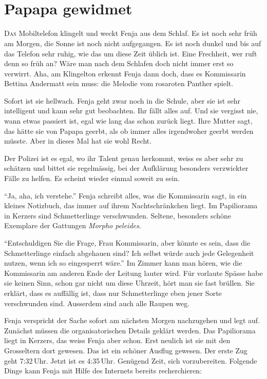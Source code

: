 \chapter*{{}\\\small \color{red} Papapa gewidmet}
\lettrine[lines=3]{\color{red}D}{as} Mobiltelefon klingelt und weckt Fenja aus dem Schlaf. Es ist noch sehr früh am Morgen, die Sonne ist noch nicht aufgegangen. Es ist noch dunkel und bis auf das Telefon sehr ruhig, wie das um diese Zeit üblich ist. Eine Frechheit, wer ruft denn so früh an? Wäre man nach dem Schlafen doch nicht immer erst so verwirrt. Aha, am Klingelton erkennt Fenja dann doch, dass es Kommissarin Bettina Andermatt sein muss: die Melodie vom rosaroten Panther spielt.

Sofort ist sie hellwach. Fenja geht zwar noch in die Schule, aber sie ist sehr intelligent und kann sehr gut beobachten. Ihr fällt alles auf. Und sie vergisst nie, wann etwas passiert ist, egal wie lang das schon zurück liegt. Ihre Mutter sagt, das hätte sie von Papapa geerbt, als ob immer alles irgendwoher geerbt werden müsste. Aber in dieses Mal hat sie wohl Recht. 

Der Polizei ist es egal, wo ihr Talent genau herkommt, weiss es aber sehr zu schätzen und bittet sie regelmässig, bei der Aufklärung besonders verzwickter Fälle zu helfen. Es scheint wieder einmal soweit zu sein.

\enquote{Ja, aha, ich verstehe.} Fenja schreibt alles, was die Kommissarin sagt, in ein kleines Notizbuch, das immer auf ihrem Nachtschränkchen liegt. Im Papiliorama in Kerzers sind Schmetterlinge verschwunden. Seltene, besonders schöne Exemplare der Gattungen \emph{Morpho peleides}.

\enquote{Entschuldigen Sie die Frage, Frau Kommissarin, aber könnte es sein, dass die Schmetterlinge einfach abgehauen sind? Ich selbst würde auch jede Gelegenheit nutzen, wenn ich so eingesperrt wäre.} Im Zimmer kann man hören, wie die Kommissarin am anderen Ende der Leitung lauter wird. Für vorlaute Spässe habe sie keinen Sinn, schon gar nicht um diese Uhrzeit, hört man sie fast brüllen. Sie erklärt, dass es auffällig ist, dass nur Schmetterlinge eben jener Sorte verschwunden sind. Ausserdem sind auch alle Raupen weg.

Fenja verspricht der Sache sofort am nächsten Morgen nachzugehen und legt auf. Zunächst müssen die organisatorischen Details geklärt werden. Das Papiliorama liegt in Kerzers, das weiss Fenja aber schon. Erst neulich ist sie mit den Grosseltern dort gewesen. Das ist ein schöner Ausflug gewesen. Der erste Zug geht 7:32\,Uhr. Jetzt ist es 4:35\,Uhr. Genügend Zeit, sich vorzubereiten. Folgende Dinge kann Fenja mit Hilfe des Internets bereits recherchieren:

